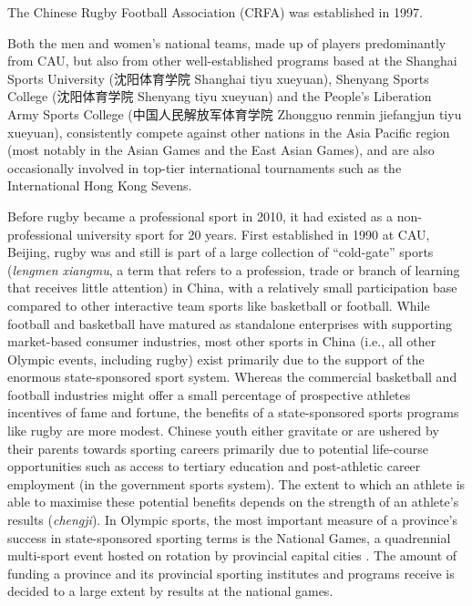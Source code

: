The Chinese Rugby Football Association (CRFA) was established in 1997.




Both the men and women’s national teams, made up of players predominantly from CAU, but also from other well-established programs based at the Shanghai Sports University (沈阳体育学院 Shanghai tiyu xueyuan), Shenyang Sports College (沈阳体育学院 Shenyang tiyu xueyuan) and the People’s Liberation Army Sports College (中国人民解放军体育学院 Zhongguo renmin jiefangjun tiyu xueyuan), consistently compete against other nations in the Asia Pacific region (most notably in the Asian Games and the East Asian Games), and are also occasionally involved in top-tier international tournaments such as the International Hong Kong Sevens.

Before rugby became a professional sport in 2010, it had existed as a non-professional university sport for 20 years.  First established in 1990 at CAU, Beijing, rugby was and still is part of a large collection of ``cold-gate'' sports (\textit{lengmen xiangmu}, a term that refers to a profession, trade or branch of learning that receives little attention) in China, with a relatively small participation base compared to other interactive team sports like basketball or football.  While football and basketball have matured as standalone enterprises with supporting market-based consumer industries, most other sports in China (i.e., all other Olympic events, including rugby) exist primarily due to the support of the enormous state-sponsored sport system.  Whereas the commercial basketball and football industries might offer a small percentage of prospective athletes incentives of fame and fortune, the benefits of a state-sponsored sports programs like rugby are more modest.  Chinese youth either gravitate or are ushered by their parents towards sporting careers primarily due to potential life-course opportunities such as access to tertiary education and post-athletic career employment (in the government sports system).  The extent to which an athlete is able to maximise these potential benefits depends on the strength of an athlete's results (\textit{chengji}).
In Olympic sports, the most important measure of a province's success in state-sponsored sporting terms is the National Games, a quadrennial multi-sport event hosted on rotation by provincial capital cities \citep{Hong2002}.  The amount of funding a province and its provincial sporting institutes and programs receive is decided to a large extent by results at the national games.


